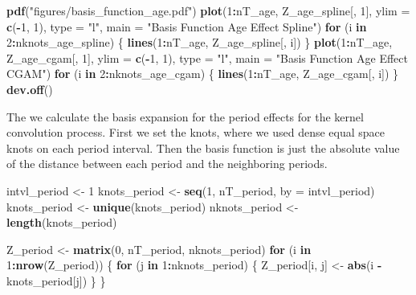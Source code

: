 \documentclass[11pt,]{article}
\newenvironment{Shaded}{\begin{snugshade}}{\end{snugshade}}
\newcommand{\KeywordTok}[1]{\textcolor[rgb]{0.13,0.29,0.53}{\textbf{#1}}}
\newcommand{\DataTypeTok}[1]{\textcolor[rgb]{0.13,0.29,0.53}{#1}}
\newcommand{\DecValTok}[1]{\textcolor[rgb]{0.00,0.00,0.81}{#1}}
\newcommand{\StringTok}[1]{\textcolor[rgb]{0.31,0.60,0.02}{#1}}
\newcommand{\ControlFlowTok}[1]{\textcolor[rgb]{0.13,0.29,0.53}{\textbf{#1}}}
\newcommand{\OperatorTok}[1]{\textcolor[rgb]{0.81,0.36,0.00}{\textbf{#1}}}
\newcommand{\NormalTok}[1]{#1}
\begin{document}
\begin{Shaded}
\begin{Highlighting}[]
\KeywordTok{pdf}\NormalTok{(}\StringTok{"figures/basis_function_age.pdf"}\NormalTok{)}
\KeywordTok{plot}\NormalTok{(}\DecValTok{1}\OperatorTok{:}\NormalTok{nT_age,}
\NormalTok{     Z_age_spline[, }\DecValTok{1}\NormalTok{],}
     \DataTypeTok{ylim =} \KeywordTok{c}\NormalTok{(}\OperatorTok{-}\DecValTok{1}\NormalTok{, }\DecValTok{1}\NormalTok{),}
     \DataTypeTok{type =} \StringTok{"l"}\NormalTok{,}
     \DataTypeTok{main =} \StringTok{"Basis Function Age Effect Spline"}\NormalTok{)}
\ControlFlowTok{for}\NormalTok{ (i }\ControlFlowTok{in} \DecValTok{2}\OperatorTok{:}\NormalTok{nknots_age_spline) \{}
  \KeywordTok{lines}\NormalTok{(}\DecValTok{1}\OperatorTok{:}\NormalTok{nT_age, Z_age_spline[, i])}
\NormalTok{\}}
\KeywordTok{plot}\NormalTok{(}\DecValTok{1}\OperatorTok{:}\NormalTok{nT_age,}
\NormalTok{     Z_age_cgam[, }\DecValTok{1}\NormalTok{],}
     \DataTypeTok{ylim =} \KeywordTok{c}\NormalTok{(}\OperatorTok{-}\DecValTok{1}\NormalTok{, }\DecValTok{1}\NormalTok{),}
     \DataTypeTok{type =} \StringTok{"l"}\NormalTok{,}
     \DataTypeTok{main =} \StringTok{"Basis Function Age Effect CGAM"}\NormalTok{)}
\ControlFlowTok{for}\NormalTok{ (i }\ControlFlowTok{in} \DecValTok{2}\OperatorTok{:}\NormalTok{nknots_age_cgam) \{}
  \KeywordTok{lines}\NormalTok{(}\DecValTok{1}\OperatorTok{:}\NormalTok{nT_age, Z_age_cgam[, i])}
\NormalTok{\}}
\KeywordTok{dev.off}\NormalTok{()}
\end{Highlighting}
\end{Shaded}

The we calculate the basis expansion for the period effects for the
kernel convolution process. First we set the knots, where we used dense
equal space knots on each period interval. Then the basis function is
just the absolute value of the distance between each period and the
neighboring periods.

\begin{Shaded}
\begin{Highlighting}[]
\NormalTok{intvl_period <-}\StringTok{ }\DecValTok{1}
\NormalTok{knots_period <-}\StringTok{ }\KeywordTok{seq}\NormalTok{(}\DecValTok{1}\NormalTok{, nT_period, }\DataTypeTok{by =}\NormalTok{ intvl_period)}
\NormalTok{knots_period <-}\StringTok{ }\KeywordTok{unique}\NormalTok{(knots_period)}
\NormalTok{nknots_period <-}\StringTok{ }\KeywordTok{length}\NormalTok{(knots_period)}

\NormalTok{Z_period <-}\StringTok{ }\KeywordTok{matrix}\NormalTok{(}\DecValTok{0}\NormalTok{, nT_period, nknots_period)}
\ControlFlowTok{for}\NormalTok{ (i }\ControlFlowTok{in} \DecValTok{1}\OperatorTok{:}\KeywordTok{nrow}\NormalTok{(Z_period)) \{}
  \ControlFlowTok{for}\NormalTok{ (j }\ControlFlowTok{in} \DecValTok{1}\OperatorTok{:}\NormalTok{nknots_period) \{}
\NormalTok{    Z_period[i, j] <-}\StringTok{ }\KeywordTok{abs}\NormalTok{(i }\OperatorTok{-}\StringTok{ }\NormalTok{knots_period[j])}
\NormalTok{  \}}
\NormalTok{\}}
\end{Highlighting}
\end{Shaded}
\end{document}
